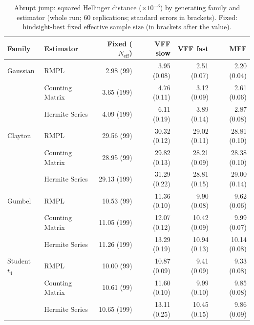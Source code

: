 \begin{table}[htbp]
\centering
\small
\caption{Abrupt jump: squared Hellinger distance ($\times10^{-3}$) by generating family and estimator (whole run; 60 replications; standard errors in brackets). Fixed: hindsight-best fixed effective sample size (in brackets after the value).}
\label{tab:app-strategy-h2-jump}
\begin{tabular}{llrrrr}
\toprule
Family & Estimator & Fixed ($N_{\mathrm{eff}}$) & VFF slow & VFF fast & MFF \\
\midrule
Gaussian & RMPL & 2.98 (99) & 3.95 (0.08) & 2.51 (0.07) & 2.20 (0.04) \\
 & Counting Matrix & 3.65 (199) & 4.76 (0.11) & 3.12 (0.09) & 2.61 (0.06) \\
 & Hermite Series & 4.09 (199) & 6.11 (0.19) & 3.89 (0.14) & 2.87 (0.08) \\
\addlinespace
Clayton & RMPL & 29.56 (99) & 30.32 (0.12) & 29.02 (0.11) & 28.81 (0.10) \\
 & Counting Matrix & 28.95 (99) & 29.82 (0.13) & 28.21 (0.09) & 28.38 (0.10) \\
 & Hermite Series & 29.13 (199) & 31.29 (0.22) & 28.81 (0.15) & 29.00 (0.14) \\
\addlinespace
Gumbel & RMPL & 10.53 (99) & 11.36 (0.10) & 9.90 (0.08) & 9.62 (0.06) \\
 & Counting Matrix & 11.05 (199) & 12.07 (0.12) & 10.42 (0.09) & 9.99 (0.07) \\
 & Hermite Series & 11.26 (199) & 13.29 (0.19) & 10.94 (0.13) & 10.14 (0.08) \\
\addlinespace
Student $t_4$ & RMPL & 10.00 (99) & 10.87 (0.09) & 9.41 (0.09) & 9.33 (0.08) \\
 & Counting Matrix & 10.61 (99) & 11.60 (0.10) & 9.99 (0.10) & 9.85 (0.08) \\
 & Hermite Series & 10.65 (199) & 13.11 (0.25) & 10.45 (0.15) & 9.86 (0.09) \\
\bottomrule
\end{tabular}
\end{table}

